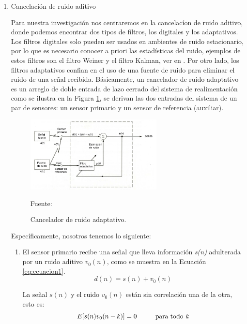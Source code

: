 \begin{enumerate}
\begin{enumerate}
\item[•]Cancelación de ruido aditivo
\par
Para nuestra investigación nos centraremos en la cancelacíon de ruido aditivo, donde podemos encontrar dos tipos de filtros, los digitales y los adaptativos. Los filtros digitales solo pueden ser usados en ambientes de ruido estacionario, por lo que es necesario conocer a priori las estadísticas del ruido, ejemplos de estos filtros son el filtro Weiner y el filtro Kalman, ver en \cite{shubhra}.
\vskip 0.5cm
Por otro lado, los filtros adaptativos confian en el uso de una fuente de ruido para eliminar el ruido de una señal recibida. Básicamente, un cancelador de ruido adaptativo es un arreglo de doble entrada de lazo cerrado del sistema de realimentación como se ilustra en la Figura \ref{fig:figura2.15}, se derivan las dos entradas del sistema de un par de sensores: un sensor primario y un sensor de referencia (auxiliar).
\newpage
\begin{figure}[ht]
\begin{center}
\includegraphics[width=0.65\textwidth]{Imagenes/Cap2/image015}
\end{center}
\begin{center}
\vskip -0.5cm
\caption{\small{Cancelador de ruido adaptativo.}}
\label{fig:figura2.15}
{\small{Fuente: \cite{walter}}}
\end{center}
\end{figure}
\vskip -0.5cm
Específicamente, nosotros tenemos lo siguiente:
\begin{enumerate}
\item[1.]El sensor primario recibe una señal que lleva información \textit{s(n)} adulterada por un ruido aditivo \textit{$v_{0}(n)$}, como se muestra en la Ecuación \eqref{eq:ecuacion1}.
\vskip -1cm
\begin{equation}
\label{eq:ecuacion1}
d(n) = s(n) + v_{0}(n)
\end{equation}

La señal $s(n)$ y el ruido $v_{0}(n)$ están sin correlación una de la otra, esto es:
\vskip -1cm
\begin{equation}
\label{eq:ecuacion2}
E[s(n)v_{0}(n-k)] = 0 \hspace{1cm} \text{para todo \textit{k}}
\end{equation}


\end{enumerate}
\end{enumerate}
\end{enumerate}
